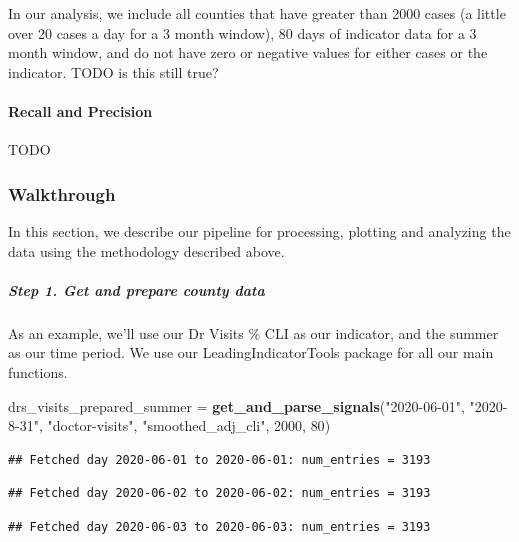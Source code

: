 \documentclass[]{article}
\newenvironment{Shaded}{\begin{snugshade}}{\end{snugshade}}
\newcommand{\DecValTok}[1]{\textcolor[rgb]{0.00,0.00,0.81}{#1}}
\newcommand{\KeywordTok}[1]{\textcolor[rgb]{0.13,0.29,0.53}{\textbf{#1}}}
\newcommand{\NormalTok}[1]{#1}
\newcommand{\StringTok}[1]{\textcolor[rgb]{0.31,0.60,0.02}{#1}}
\let\oldparagraph\paragraph
\renewcommand{\paragraph}[1]{\oldparagraph{#1}\mbox{}}
\let\oldsubparagraph\subparagraph
\renewcommand{\subparagraph}[1]{\oldsubparagraph{#1}\mbox{}}
\begin{document}
In our analysis, we include all counties that have greater than 2000
cases (a little over 20 cases a day for a 3 month window), 80 days of
indicator data for a 3 month window, and do not have zero or negative
values for either cases or the indicator. TODO is this still true?

\hypertarget{recall-and-precision}{%
\paragraph{Recall and Precision}\label{recall-and-precision}}

TODO

\hypertarget{walkthrough}{%
\subsubsection{Walkthrough}\label{walkthrough}}

In this section, we describe our pipeline for processing, plotting and
analyzing the data using the methodology described above.

\hypertarget{step-1.-get-and-prepare-county-data}{%
\subparagraph{Step 1. Get and prepare county
data}\label{step-1.-get-and-prepare-county-data}}

As an example, we'll use our Dr Visits \% CLI as our indicator, and the
summer as our time period. We use our LeadingIndicatorTools package for
all our main functions.

\begin{Shaded}
\begin{Highlighting}[]
\NormalTok{drs_visits_prepared_summer =}\StringTok{ }\KeywordTok{get_and_parse_signals}\NormalTok{(}\StringTok{"2020-06-01"}\NormalTok{, }\StringTok{"2020-8-31"}\NormalTok{, }\StringTok{"doctor-visits"}\NormalTok{, }\StringTok{"smoothed_adj_cli"}\NormalTok{, }\DecValTok{2000}\NormalTok{, }\DecValTok{80}\NormalTok{)}
\end{Highlighting}
\end{Shaded}

\begin{verbatim}
## Fetched day 2020-06-01 to 2020-06-01: num_entries = 3193
\end{verbatim}

\begin{verbatim}
## Fetched day 2020-06-02 to 2020-06-02: num_entries = 3193
\end{verbatim}

\begin{verbatim}
## Fetched day 2020-06-03 to 2020-06-03: num_entries = 3193
\end{verbatim}
\end{document}
